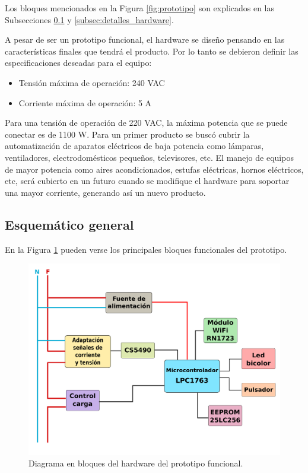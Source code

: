 Los bloques mencionados en la Figura \ref{fig:prototipo} son explicados en las Subsecciones \ref{subsec:esquematico_general} y \ref{subsec:detalles_hardware}.

A pesar de ser un prototipo funcional, el hardware se diseño pensando en las características finales que tendrá el producto. Por lo tanto se debieron definir las especificaciones deseadas para el equipo:

\begin{itemize}
\item Tensión máxima de operación: 240 VAC
\item Corriente máxima de operación: 5 A
\end{itemize}

Para una tensión de operación de 220 VAC, la máxima potencia que se puede conectar es de 1100 W. Para un primer producto se buscó cubrir la automatización de aparatos eléctricos de baja potencia como lámparas, ventiladores, electrodomésticos pequeños, televisores, etc. El manejo de equipos de mayor potencia como aires acondicionados, estufas eléctricas, hornos eléctricos, etc, será cubierto en un futuro cuando se modifique el hardware para soportar una mayor corriente, generando así un nuevo producto.



\subsection{Esquemático general}
\label{subsec:esquematico_general}

En la Figura \ref{fig:hardware_diagrama_bloques} pueden verse los principales bloques funcionales del prototipo.

\begin{figure}[h]
	\centering
	\includegraphics[width=12cm]{./Figures/3_1_1_diagrama_bloques_hardware.png}
	\caption{Diagrama en bloques del hardware del prototipo funcional.}
	\label{fig:hardware_diagrama_bloques}
\end{figure}

